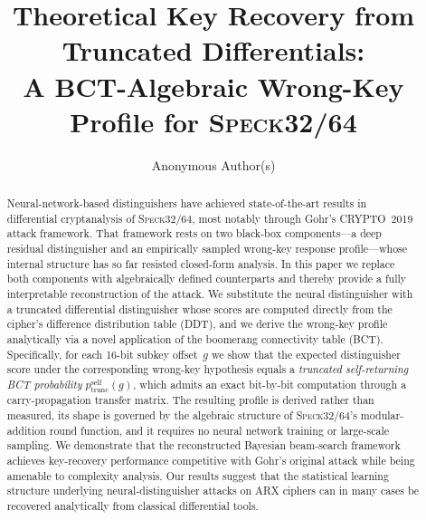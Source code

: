 \documentclass[runningheads]{llncs}
\newcommand{\pself}{p^{\mathrm{self}}_{\mathrm{trunc}}}
\newcommand{\speck}{\textsc{Speck}32/64}
\begin{document}

\title{Theoretical Key Recovery from Truncated Differentials:\\
       A BCT-Algebraic Wrong-Key Profile for \speck{}}

\author{Anonymous Author(s)}
\institute{}


\maketitle

\begin{abstract}
Neural-network-based distinguishers have achieved state-of-the-art
results in differential cryptanalysis of \speck{}, most notably
through Gohr's CRYPTO~2019 attack framework.  That framework rests on
two black-box components—a deep residual distinguisher and an
empirically sampled wrong-key response profile—whose internal
structure has so far resisted closed-form analysis.  In this paper we
replace both components with algebraically defined counterparts and
thereby provide a fully interpretable reconstruction of the attack.
We substitute the neural distinguisher with a truncated differential
distinguisher whose scores are computed directly from the cipher's
difference distribution table (DDT), and we derive the wrong-key
profile analytically via a novel application of the boomerang
connectivity table (BCT).  Specifically, for each 16-bit subkey
offset~$g$ we show that the expected distinguisher score under the
corresponding wrong-key hypothesis equals a \emph{truncated
self-returning BCT probability} $\pself(g)$, which admits an exact
bit-by-bit computation through a carry-propagation transfer matrix.
The resulting profile is derived rather than measured, its shape is
governed by the algebraic structure of \speck{}'s modular-addition
round function, and it requires no neural network training or
large-scale sampling.  We demonstrate that the reconstructed Bayesian
beam-search framework achieves key-recovery performance competitive
with Gohr's original attack while being amenable to complexity
analysis.  Our results suggest that the statistical learning structure
underlying neural-distinguisher attacks on ARX ciphers can in many
cases be recovered analytically from classical differential tools.
\end{abstract}
\end{document}
